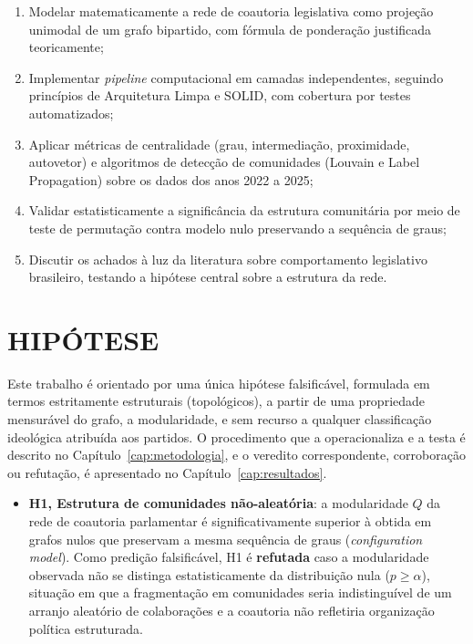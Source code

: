 \documentclass[
      12pt,
      a4paper,
      openright,
      oneside,
      chapter=TITLE,
      section=TITLE,
      english,
      french,
      spanish,
      brazilian
    ]{abntex2}
\begin{document}
    \begin{enumerate}[label=\alph*)]
        \item Modelar matematicamente a rede de coautoria legislativa como projeção unimodal de um grafo bipartido, com fórmula de ponderação justificada teoricamente;
         \item Implementar \textit{pipeline} computacional em camadas independentes, seguindo princípios de Arquitetura Limpa e SOLID, com cobertura por testes automatizados;
        \item Aplicar métricas de centralidade (grau, intermediação, proximidade, autovetor) e algoritmos de detecção de comunidades (Louvain e Label Propagation) sobre os dados dos anos 2022 a 2025;
        \item Validar estatisticamente a significância da estrutura comunitária por meio de teste de permutação contra modelo nulo preservando a sequência de graus;
        \item Discutir os achados à luz da literatura sobre comportamento legislativo brasileiro, testando a hipótese central sobre a estrutura da rede.
    \end{enumerate}
    
    \section{HIPÓTESE}
    
    Este trabalho é orientado por uma única hipótese falsificável, formulada em termos estritamente estruturais (topológicos), a partir de uma propriedade mensurável do grafo, a modularidade, e sem recurso a qualquer classificação ideológica atribuída aos partidos. O procedimento que a operacionaliza e a testa é descrito no Capítulo~\ref{cap:metodologia}, e o veredito correspondente, corroboração ou refutação, é apresentado no Capítulo~\ref{cap:resultados}.
    
    \begin{itemize}
        \item \textbf{H1, Estrutura de comunidades não-aleatória}: a modularidade $Q$ da rede de coautoria parlamentar é significativamente superior à obtida em grafos nulos que preservam a mesma sequência de graus (\textit{configuration model}). Como predição falsificável, H1 é \textbf{refutada} caso a modularidade observada não se distinga estatisticamente da distribuição nula ($p \geq \alpha$), situação em que a fragmentação em comunidades seria indistinguível de um arranjo aleatório de colaborações e a coautoria não refletiria organização política estruturada.
    \end{itemize}
    
\end{document}
